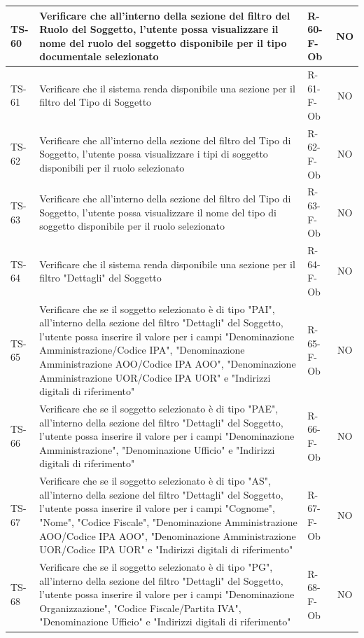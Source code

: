 \documentclass[a4paper,12pt]{article}
\begin{document}
\begin{longtable}{|p{1.5cm}|p{8.3cm}|p{2.4cm}|c|}
\hline
TS-60 & Verificare che all'interno della sezione del filtro del Ruolo del Soggetto, l'utente possa visualizzare il nome del ruolo del soggetto disponibile per il tipo documentale selezionato & R-60-F-Ob & NO \\
\hline
TS-61 & Verificare che il sistema renda disponibile una sezione per il filtro del Tipo di Soggetto & R-61-F-Ob & NO \\
\hline
TS-62 & Verificare che all'interno della sezione del filtro del Tipo di Soggetto, l'utente possa visualizzare i tipi di soggetto disponibili per il ruolo selezionato & R-62-F-Ob & NO \\
\hline
TS-63 & Verificare che all'interno della sezione del filtro del Tipo di Soggetto, l'utente possa visualizzare il nome del tipo di soggetto disponibile per il ruolo selezionato & R-63-F-Ob & NO \\
\hline
TS-64 & Verificare che il sistema renda disponibile una sezione per il filtro "Dettagli" del Soggetto & R-64-F-Ob & NO \\
\hline
TS-65 & Verificare che se il soggetto selezionato è di tipo "PAI", all'interno della sezione del filtro "Dettagli" del Soggetto, l'utente possa inserire il valore per i campi "Denominazione Amministrazione/Codice IPA", "Denominazione Amministrazione AOO/Codice IPA AOO", "Denominazione Amministrazione UOR/Codice IPA UOR" e "Indirizzi digitali di riferimento" & R-65-F-Ob & NO \\
\hline
TS-66 & Verificare che se il soggetto selezionato è di tipo "PAE", all'interno della sezione del filtro "Dettagli" del Soggetto, l'utente possa inserire il valore per i campi "Denominazione Amministrazione", "Denominazione Ufficio" e "Indirizzi digitali di riferimento" & R-66-F-Ob & NO \\
\hline
TS-67 & Verificare che se il soggetto selezionato è di tipo "AS", all'interno della sezione del filtro "Dettagli" del Soggetto, l'utente possa inserire il valore per i campi "Cognome", "Nome", "Codice Fiscale", "Denominazione Amministrazione AOO/Codice IPA AOO", "Denominazione Amministrazione UOR/Codice IPA UOR" e "Indirizzi digitali di riferimento" & R-67-F-Ob & NO \\
\hline
TS-68 & Verificare che se il soggetto selezionato è di tipo "PG", all'interno della sezione del filtro "Dettagli" del Soggetto, l'utente possa inserire il valore per i campi "Denominazione Organizzazione", "Codice Fiscale/Partita IVA", "Denominazione Ufficio" e "Indirizzi digitali di riferimento" & R-68-F-Ob & NO \\

\end{longtable}
\end{document}
